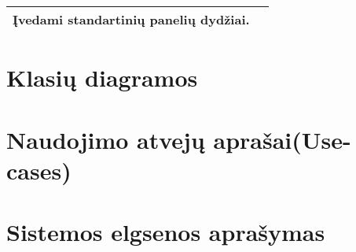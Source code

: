 \documentclass[a4paper,12pt]{article}
\begin{document}
\begin{frame}
\begin{tabular}{|l|c|}
Įvedami standartinių panelių dydžiai.                                                                                                                                                                                                                                                                                                                     &                       \\ \hline
\end{tabular}
\end{frame}


\section{Klasių diagramos}

\section{Naudojimo atvejų aprašai(Use-cases)}


\section{Sistemos elgsenos aprašymas}
\end{document}
